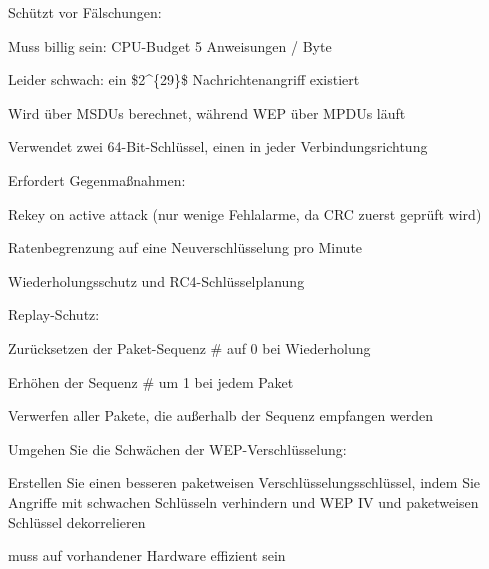 \documentclass[a4paper]{article}
\begin{document}
\begin{multicols}{3}
      \begin{itemize*}
            \item Schützt vor Fälschungen:
            \begin{itemize*}
                  \item Muss billig sein: CPU-Budget 5 Anweisungen / Byte
                  \item Leider schwach: ein \$2\^{}\{29\}\$ Nachrichtenangriff existiert
                  \item Wird über MSDUs berechnet, während WEP über MPDUs läuft
                  \item Verwendet zwei 64-Bit-Schlüssel, einen in jeder Verbindungsrichtung
                  \item Erfordert Gegenmaßnahmen:
                  \begin{itemize*} \item Rekey on active attack (nur wenige Fehlalarme, da CRC zuerst geprüft wird) \item Ratenbegrenzung auf eine Neuverschlüsselung pro Minute \end{itemize*}
            \end{itemize*}
      \end{itemize*}

      Wiederholungsschutz und RC4-Schlüsselplanung

      \begin{itemize*}
            \item Replay-Schutz:
            \begin{itemize*}
                  \item Zurücksetzen der Paket-Sequenz \# auf 0 bei Wiederholung
                  \item Erhöhen der Sequenz \# um 1 bei jedem Paket
                  \item Verwerfen aller Pakete, die außerhalb der Sequenz empfangen werden
            \end{itemize*}
            \item Umgehen Sie die Schwächen der WEP-Verschlüsselung:
            \begin{itemize*}
                  \item Erstellen Sie einen besseren paketweisen Verschlüsselungsschlüssel, indem Sie Angriffe mit schwachen Schlüsseln verhindern und WEP IV und paketweisen Schlüssel dekorrelieren
                  \item muss auf vorhandener Hardware effizient sein
            \end{itemize*}
      \end{itemize*}


\end{multicols}
\end{document}
